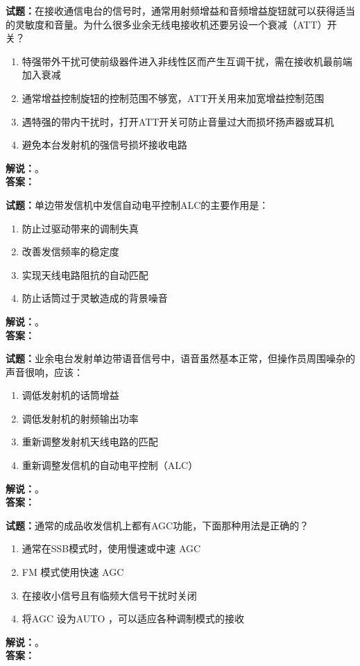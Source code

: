 \documentclass{ctexbook}
\begin{document}
\noindent\textbf{试题：}在接收通信电台的信号时，通常用射频增益和音频增益旋钮就可以获得适当的灵敏度和音量。为什么很多业余无线电接收机还要另设一个衰减（ATT）开关？
\begin{enumerate}[leftmargin=3em]
\item 特强带外干扰可使前级器件进入非线性区而产生互调干扰，需在接收机最前端加入衰减
\item 通常增益控制旋钮的控制范围不够宽，ATT开关用来加宽增益控制范围
\item 遇特强的带内干扰时，打开ATT开关可防止音量过大而损坏扬声器或耳机	
\item 避免本台发射机的强信号损坏接收电路
\end{enumerate}
\noindent\textbf{解说：}\textbf{}。\\\noindent\textbf{答案：}

\bigskip




\noindent\textbf{试题：}单边带发信机中发信自动电平控制ALC的主要作用是：
\begin{enumerate}[leftmargin=3em]
\item 防止过驱动带来的调制失真
\item 改善发信频率的稳定度
\item 实现天线电路阻抗的自动匹配
\item 防止话筒过于灵敏造成的背景噪音
\end{enumerate}
\noindent\textbf{解说：}\textbf{}。\\\noindent\textbf{答案：}

\bigskip




\noindent\textbf{试题：}业余电台发射单边带语音信号中，语音虽然基本正常，但操作员周围噪杂的声音很响，应该：
\begin{enumerate}[leftmargin=3em]
\item 调低发射机的话筒增益
\item 调低发射机的射频输出功率
\item 重新调整发射机天线电路的匹配
\item 重新调整发信机的自动电平控制（ALC）
\end{enumerate}
\noindent\textbf{解说：}\textbf{}。\\\noindent\textbf{答案：}

\bigskip




\noindent\textbf{试题：}通常的成品收发信机上都有AGC功能，下面那种用法是正确的？
\begin{enumerate}[leftmargin=3em]
\item 通常在SSB模式时，使用慢速或中速 AGC
\item FM 模式使用快速 AGC
\item 在接收小信号且有临频大信号干扰时关闭
\item 将AGC 设为AUTO ，可以适应各种调制模式的接收
\end{enumerate}
\noindent\textbf{解说：}\textbf{}。\\\noindent\textbf{答案：}
\end{document}
